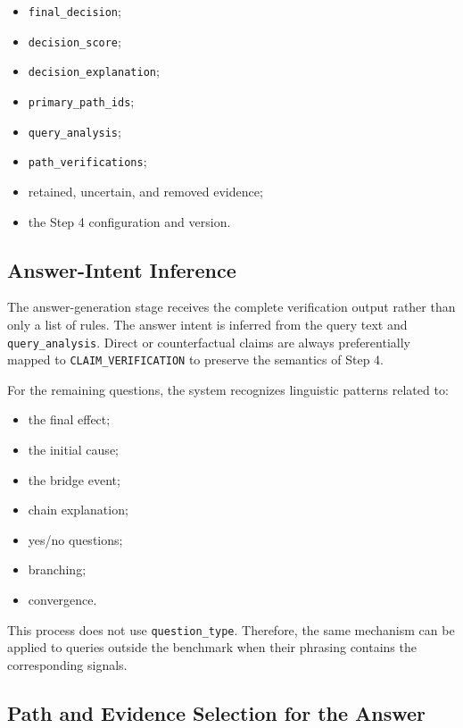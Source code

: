 \begin{itemize}
    \item \texttt{final\_decision};
    \item \texttt{decision\_score};
    \item \texttt{decision\_explanation};
    \item \texttt{primary\_path\_ids};
    \item \texttt{query\_analysis};
    \item \texttt{path\_verifications};
    \item retained, uncertain, and removed evidence;
    \item the Step 4 configuration and version.
\end{itemize}

\subsection{Answer-Intent Inference}

The answer-generation stage receives the complete verification output rather
than only a list of rules. The answer intent is inferred from the query text
and \texttt{query\_analysis}. Direct or counterfactual claims are always
preferentially mapped to \texttt{CLAIM\_VERIFICATION} to preserve the
semantics of Step 4.

For the remaining questions, the system recognizes linguistic patterns
related to:

\begin{itemize}
    \item the final effect;
    \item the initial cause;
    \item the bridge event;
    \item chain explanation;
    \item yes/no questions;
    \item branching;
    \item convergence.
\end{itemize}

This process does not use \texttt{question\_type}. Therefore, the same
mechanism can be applied to queries outside the benchmark when their phrasing
contains the corresponding signals.

\subsection{Path and Evidence Selection for the Answer}

